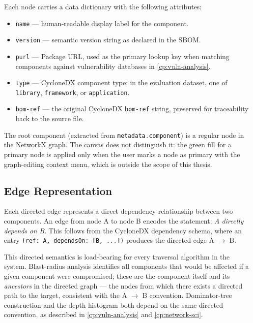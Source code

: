 Each node carries a data dictionary with the following attributes:

\begin{itemize}
    \item \texttt{name} --- human-readable display label for the component.
    \item \texttt{version} --- semantic version string as declared in the SBOM.
    \item \texttt{purl} --- Package URL, used as the primary lookup key when matching components against vulnerability databases in \autoref{cp:vuln-analysis}.
    \item \texttt{type} --- CycloneDX component type; in the evaluation dataset, one of \texttt{library}, \texttt{framework}, or \texttt{application}.
    \item \texttt{bom-ref} --- the original CycloneDX \texttt{bom-ref} string, preserved for traceability back to the source file.
\end{itemize}

The root component (extracted from \texttt{metadata.component}) is a regular node in the NetworkX graph. The canvas does not distinguish it: the green fill for a primary node is applied only when the user marks a node as primary with the graph-editing context menu, which is outside the scope of this thesis.


\subsection{Edge Representation}
\label{sec:edge-representation}

Each directed edge represents a direct dependency relationship between two components. An edge from node A to node B encodes the statement: \textit{A directly depends on B}. This follows from the CycloneDX dependency schema, where an entry \texttt{(ref: A, dependsOn: [B, ...])} produces the directed edge A \(\to\) B.

This directed semantics is load-bearing for every traversal algorithm in the system. Blast-radius analysis identifies all components that would be affected if a given component were compromised; these are the component itself and its \textit{ancestors} in the directed graph --- the nodes from which there exists a directed path to the target, consistent with the A \(\to\) B convention. Dominator-tree construction and the depth histogram both depend on the same directed convention, as described in \autoref{cp:vuln-analysis} and \autoref{cp:network-sci}.

